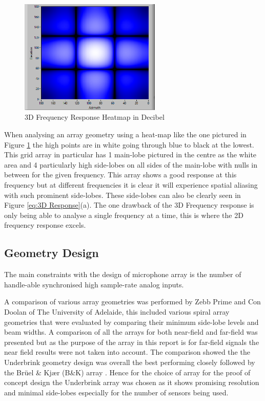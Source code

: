 \documentclass{UoNMCHA}
\numberwithin{equation}{section}
\begin{document}
    \begin{figure}[H]
        \centering
        \includegraphics[keepaspectratio, width = 0.6\textwidth]{Figures/3DHeatFigure.png}
        \caption{3D Frequency Response Heatmap in Decibel}
        \label{fig:3D Heatmap}
    \end{figure}
    
    When analysing an array geometry using a heat-map like the one pictured in Figure \ref{fig:3D Heatmap} the high points are in white going through blue to black at the lowest. This grid array in particular has 1 main-lobe pictured in the centre as the white area and 4 particularly high side-lobes on all sides of the main-lobe with nulls in between for the given frequency. This array shows a good response at this frequency but at different frequencies it is clear it will experience spatial aliasing with such prominent side-lobes. These side-lobes can also be clearly seen in Figure \ref{eq:3D Response}(a). The one drawback of the 3D Frequency response is only being able to analyse a single frequency at a time, this is where the 2D frequency response excels.

\subsection{Geometry Design} \label{sec:Array Geometry}

    The main constraints with the design of microphone array is the number of handle-able synchronised high sample-rate analog inputs.
    
    A comparison of various array geometries was performed by Zebb Prime and Con Doolan of The University of Adelaide, this included various spiral array geometries that were evaluated by comparing their minimum side-lobe levels and beam widths. A comparison of all the arrays for both near-field and far-field was presented but as the purpose of the array in this report is for far-field signals the near field results were not taken into account. The comparison showed the the Underbrink geometry design was overall the best performing closely followed by the Brüel \& Kjær (B\&K) array \citep{Pri13}. Hence for the choice of array for the proof of concept design the Underbrink array was chosen as it shows promising resolution and minimal side-lobes especially for the number of sensors being used.
    
\end{document}
